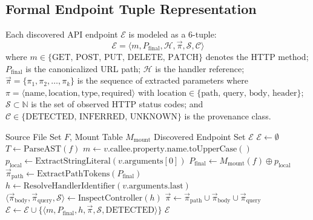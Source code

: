\documentclass[a4paper,10pt]{article}
\begin{document}
\subsection{Formal Endpoint Tuple Representation}
\noindent
Each discovered API endpoint $\mathcal{E}$ is modeled as a 6-tuple:
\begin{equation}
\mathcal{E} = \langle m, P_{\text{final}}, \mathcal{H}, \vec{\pi}, \mathcal{S}, \mathcal{C} \rangle
\end{equation}
where $m \in \{\text{GET, POST, PUT, DELETE, PATCH}\}$ denotes the HTTP method; $P_{\text{final}}$ is the canonicalized URL path; $\mathcal{H}$ is the handler reference; $\vec{\pi} = \{\pi_1, \pi_2, \dots, \pi_k\}$ is the sequence of extracted parameters where $\pi = \langle \text{name}, \text{location}, \text{type}, \text{required} \rangle$ with $\text{location} \in \{\text{path, query, body, header}\}$; $\mathcal{S} \subset \mathbb{N}$ is the set of observed HTTP status codes; and $\mathcal{C} \in \{\text{DETECTED, INFERRED, UNKNOWN}\}$ is the provenance class.

\begin{algorithm}[t]
\caption{Hierarchical Router Mount Resolution \& AST Endpoint Extraction.}
\label{alg:extraction}
\begin{algorithmic}[1]
\REQUIRE Source File Set $F$, Mount Table $M_{\text{mount}}$
\ENSURE Discovered Endpoint Set $\mathcal{E}$
\STATE $\mathcal{E} \leftarrow \emptyset$
  \STATE $T \leftarrow \text{ParseAST}(f)$
      \STATE $m \leftarrow v.\text{callee}.\text{property}.\text{name}.\text{toUpperCase}()$
      \STATE $p_{\text{local}} \leftarrow \text{ExtractStringLiteral}(v.\text{arguments}[0])$
      \STATE $P_{\text{final}} \leftarrow M_{\text{mount}}(f) \oplus p_{\text{local}}$
      \STATE $\vec{\pi}_{\text{path}} \leftarrow \text{ExtractPathTokens}(P_{\text{final}})$
      \STATE $h \leftarrow \text{ResolveHandlerIdentifier}(v.\text{arguments}.\text{last})$
      \STATE $\langle \vec{\pi}_{\text{body}}, \vec{\pi}_{\text{query}}, \mathcal{S} \rangle \leftarrow \text{InspectController}(h)$
      \STATE $\vec{\pi} \leftarrow \vec{\pi}_{\text{path}} \cup \vec{\pi}_{\text{body}} \cup \vec{\pi}_{\text{query}}$
      \STATE $\mathcal{E} \leftarrow \mathcal{E} \cup \{ \langle m, P_{\text{final}}, h, \vec{\pi}, \mathcal{S}, \text{DETECTED} \rangle \}$
    \ENDIF
  \ENDFOR
\ENDFOR
\RETURN $\mathcal{E}$
\end{algorithmic}
\end{algorithm}
\end{document}
